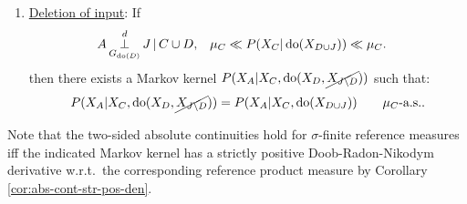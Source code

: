 \begin{Cor}
\begin{enumerate}
         \begin{align*} 
             A &\Perp^d_{G_{\doit(I_B,D)}} I_B \given C  \cup D, &          
             \mu_C &\ll P(X_C|\doit(X_B,X_{D})) \ll \mu_C, \\
                   && \mu_C &\ll P(X_C|\doit(X_{D})) \ll \mu_C.
         \end{align*}
       \item \underline{Deletion of input}:
         If 
         \begin{align*} 
           A &\operatorname*{\perp}^d_{G_{\operatorname{do}(D)}} J \operatorname*{|} C \cup D, &          
             \mu_C &\ll P(X_C|\operatorname{do}(X_{D\cup J})) \ll \mu_C.
         \end{align*}
         then there exists a Markov kernel $P(X_A|X_C,\operatorname{do}(X_{D},\cancel{X_{J\setminus D}}))$ such that:
         \[ P(X_A|X_C,\operatorname{do}(X_{D},\cancel{X_{J\setminus D}})) = P(X_A|X_C,\operatorname{do}(X_{D \cup J})) \qquad \mu_C\text{-a.s.}. \]
    \end{enumerate}
    Note that the two-sided absolute continuities hold for $\sigma$-finite reference measures iff the indicated Markov kernel has a strictly positive Doob-Radon-Nikodym derivative w.r.t.\ the corresponding reference product measure by Corollary \ref{cor:abs-cont-str-pos-den}.
\end{Cor}
